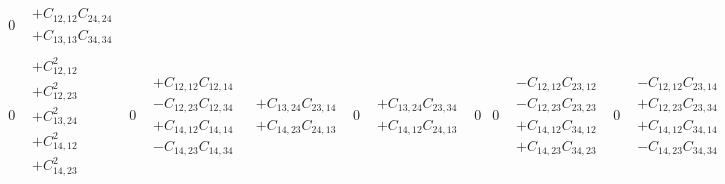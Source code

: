 \documentclass[pra,nofootinbib]{revtex4-1}
\newcommand{\C}[2]{C_{{#1},{#2}}}
\begin{document}
\begin{eqnarray}
\begin{array}{cccccccccccccccc}
     0 &
     \begin{array}{c}
     + \C{12}{12}\C{24}{24} \\
     + \C{13}{13}\C{34}{34}
     \end{array} \\
     0 &
     \begin{array}{c}
     + \C{12}{12}^2 \\
     + \C{12}{23}^2 \\
     + \C{13}{24}^2 \\
     + \C{14}{12}^2 \\
     + \C{14}{23}^2
     \end{array} &
     0 &
     \begin{array}{c}
     + \C{12}{12}\C{12}{14} \\
     - \C{12}{23}\C{12}{34} \\
     + \C{14}{12}\C{14}{14} \\
     - \C{14}{23}\C{14}{34}
     \end{array} &
     \begin{array}{c}
     + \C{13}{24}\C{23}{14} \\
     + \C{14}{23}\C{24}{13} 
     \end{array} &
     0 &
     \begin{array}{c}
     + \C{13}{24}\C{23}{34} \\
     + \C{14}{12}\C{24}{13} 
     \end{array} &
     0 &
     0 &
     \begin{array}{c}
     - \C{12}{12}\C{23}{12} \\
     - \C{12}{23}\C{23}{23} \\
     + \C{14}{12}\C{34}{12} \\
     + \C{14}{23}\C{34}{23}
     \end{array} &
     0 &
     \begin{array}{c}
     - \C{12}{12}\C{23}{14} \\
     + \C{12}{23}\C{23}{34} \\
     + \C{14}{12}\C{34}{14} \\
     - \C{14}{23}\C{34}{34}
     \end{array} &
     \begin{array}{c}
     - \C{12}{23}\C{24}{13} \\
     - \C{13}{24}\C{34}{14}
     \end{array} &
     0 &
     \begin{array}{c}
     - \C{12}{12}\C{24}{13} \\

\end{array}
\end{array}
\end{eqnarray}
\end{document}

